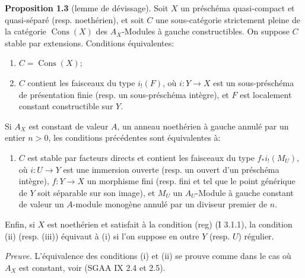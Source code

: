 \documentclass[11pt]{article}
\providecommand{\Cons}{\operatorname{Cons}}
\begin{document}
\textbf{Proposition 1.3} (lemme de dévissage). Soit $X$ un préschéma quasi-compact et quasi-séparé (resp. noethérien), et soit $C$ une sous-catégorie strictement pleine de la catégorie $\Cons(X)$ des $A_X$-Modules à gauche constructibles. On suppose $C$ stable par extensions. Conditions équivalentes:
\begin{enumerate}[label=(\roman*)]
\item $C=\Cons(X)$;
\item $C$ contient les faisceaux du type $i_!(F)$, où $i:Y\to X$ est un sous-préschéma de présentation finie (resp. un sous-préschéma intègre), et $F$ est localement constant constructible sur $Y$.
\end{enumerate}
Si $A_X$ est constant de valeur $A$, un anneau noethérien à gauche annulé par un entier $n>0$, les conditions précédentes sont équivalentes à:
\begin{enumerate}[label=(\roman*),start=3]
\item $C$ est stable par facteurs directs et contient les faisceaux du type $f_*i_!(M_U)$, où $i:U\to Y$ est une immersion ouverte (resp. un ouvert d'un préschéma intègre), $f:Y\to X$ un morphisme fini (resp. fini et tel que le point générique de $Y$ soit séparable sur son image), et $M_U$ un $A_U$-Module à gauche constant de valeur un $A$-module monogène annulé par un diviseur premier de $n$.
\end{enumerate}
Enfin, si $X$ est noethérien et satisfait à la condition (reg) (I 3.1.1), la condition (ii) (resp. (iii)) équivaut à (i) si l'on suppose en outre $Y$ (resp. $U$) régulier.

\emph{Preuve.} L'équivalence des conditions (i) et (ii) se prouve comme dans le cas où $A_X$ est constant, voir (SGAA IX 2.4 et 2.5).
\end{document}
